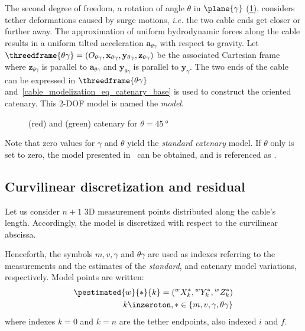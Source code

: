 The second degree of freedom, a rotation of angle $\theta$ in $\plane{\gamma}$
(\cref{cable_modelization_fig_theta_augmented_catenary}), considers tether deformations caused by
surge motions, \textit{i.e.} the two cable ends get closer or further away. The approximation of
uniform hydrodynamic forces along the cable results in a uniform tilted acceleration
$\mathbf{a}_{\theta\gamma}$ with respect to gravity. Let $\threedframe{\theta\gamma} =
	(O_{\theta\gamma}, \mathbf{x}_{\theta\gamma}, \mathbf{y}_{\theta\gamma},
	\mathbf{z}_{\theta\gamma})$ be the associated Cartesian frame where $\mathbf{z}_{\theta\gamma}$ is
parallel to $\mathbf{a}_{\theta\gamma}$ and $\mathbf{y}_{\theta\gamma}$ is parallel to
$\mathbf{y}_{\gamma}$. The two ends of the cable can be expressed in $\threedframe{\theta\gamma}$
and~\cref{cable_modelization_eq_catenary_base} is used to construct the oriented catenary. This
2-DOF model is named the \emph{\thetagammamodel{} model}.

\begin{figure}
	\centering
	\caption{
		\gammamodel{} (red) and \thetagammamodel{} (green) catenary for $\theta = \qty{45}{\degree}$
	} \label{cable_modelization_fig_theta_augmented_catenary}
\end{figure}

Note that zero values for $\gamma$ and $\theta$ yield the \emph{standard catenary} model. If
$\theta$ only is set to zero, the model presented in~\cite{Dru_Dun2022b} can be obtained, and is
referenced as \emph{\gammamodel{}}.

\subsection{Curvilinear discretization and residual}

Let us consider $n+1$ 3D measurement points distributed along the cable's length. Accordingly, the
model is discretized with respect to the curvilinear abscissa.

Henceforth, the symbols $m,v, \gamma$ and $\theta\gamma$ are used as indexes referring to the
measurements and the estimates of the \textit{standard}, \gammamodel{} and \thetagammamodel{}
catenary model variations, respectively. Model points are written:
\begin{align*}
	\pestimated{w}{\ast}{k}=({}^{w}X_{k}^{\ast}, {}^{w}Y_{k}^{\ast}, {}^{w}Z_{k}^{\ast}) \\
	k\inzeroton, \ast\in \left\{ m, v, \gamma, \theta\gamma \right\}
\end{align*}
where indexes $k=0$ and $k=n$ are the tether endpoints, also indexed $i$ and $f$.

